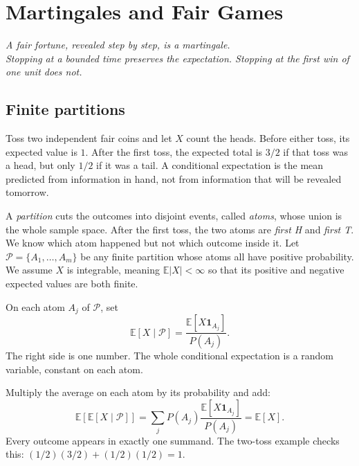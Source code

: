\chapter{Martingales and Fair Games}

\begin{center}\itshape
A fair fortune, revealed step by step, is a martingale.\\
Stopping at a bounded time preserves the expectation. Stopping at the first win of one unit does not.
\end{center}

\section{Finite partitions}

Toss two independent fair coins and let $X$ count the heads. Before either toss, its expected value is $1$. After the first toss, the expected total is $3/2$ if that toss was a head, but only $1/2$ if it was a tail. A conditional expectation is the mean predicted from information in hand, not from information that will be revealed tomorrow.

A \emph{partition} cuts the outcomes into disjoint events, called \emph{atoms}, whose union is the whole sample space. After the first toss, the two atoms are \emph{first H} and \emph{first T}. We know which atom happened but not which outcome inside it. Let $\mathcal P=\{A_1,\ldots,A_m\}$ be any finite partition whose atoms all have positive probability. We assume $X$ is integrable, meaning $\mathbb E|X|<\infty$ so that its positive and negative expected values are both finite.

\begin{definition}\label{def:condexp}
On each atom $A_j$ of $\mathcal P$, set
\[
 \mathbb E[X\mid\mathcal P]
 =\frac{\mathbb E[X\mathbf1_{A_j}]}{P(A_j)}.
\]
The right side is one number. The whole conditional expectation is a random variable, constant on each atom.
\end{definition}

Multiply the average on each atom by its probability and add:
\[
 \mathbb E[\mathbb E[X\mid\mathcal P]]
 =\sum_j P(A_j)\frac{\mathbb E[X\mathbf1_{A_j}]}{P(A_j)}
 =\mathbb E[X].
\]
Every outcome appears in exactly one summand. The two-toss example checks this: $(1/2)(3/2)+(1/2)(1/2)=1$.

